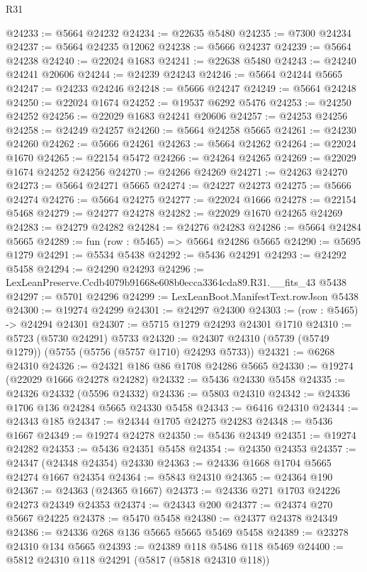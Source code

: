 \begin{lexlean}{R31}
\begin{coremodule}
@24233 := @5664 @24232
@24234 := @22635 @5480
@24235 := @7300 @24234
@24237 := @5664 @24235 @12062
@24238 := @5666 @24237
@24239 := @5664 @24238
@24240 := @22024 @1683
@24241 := @22638 @5480
@24243 := @24240 @24241 @20606
@24244 := @24239 @24243
@24246 := @5664 @24244 @5665
@24247 := @24233 @24246
@24248 := @5666 @24247
@24249 := @5664 @24248
@24250 := @22024 @1674
@24252 := @19537 @6292 @5476
@24253 := @24250 @24252
@24256 := @22029 @1683 @24241 @20606
@24257 := @24253 @24256
@24258 := @24249 @24257
@24260 := @5664 @24258 @5665
@24261 := @24230 @24260
@24262 := @5666 @24261
@24263 := @5664 @24262
@24264 := @22024 @1670
@24265 := @22154 @5472
@24266 := @24264 @24265
@24269 := @22029 @1674 @24252 @24256
@24270 := @24266 @24269
@24271 := @24263 @24270
@24273 := @5664 @24271 @5665
@24274 := @24227 @24273
@24275 := @5666 @24274
@24276 := @5664 @24275
@24277 := @22024 @1666
@24278 := @22154 @5468
@24279 := @24277 @24278
@24282 := @22029 @1670 @24265 @24269
@24283 := @24279 @24282
@24284 := @24276 @24283
@24286 := @5664 @24284 @5665
@24289 := fun (row : @5465) => @5664 @24286 @5665
@24290 := @5695 @1279
@24291 := @5534 @5438
@24292 := @5436 @24291
@24293 := @24292 @5458
@24294 := @24290 @24293
@24296 := LexLeanPreserve.Ccdb4079b91668e608b0ecca3364cda89.R31.__fits_43 @5438
@24297 := @5701 @24296
@24299 := LexLeanBoot.ManifestText.rowJson @5438
@24300 := @19274 @24299
@24301 := @24297 @24300
@24303 := (row : @5465) -> @24294 @24301
@24307 := @5715 @1279 @24293 @24301 @1710
@24310 := @5723 (@5730 @24291) @5733
@24320 := @24307 @24310 (@5739 (@5749 @1279)) (@5755 (@5756 (@5757 @1710) @24293 @5733))
@24321 := @6268 @24310
@24326 := @24321 @186 @86 @1708 @24286 @5665
@24330 := @19274 (@22029 @1666 @24278 @24282)
@24332 := @5436 @24330 @5458
@24335 := @24326 @24332 (@5596 @24332)
@24336 := @5803 @24310
@24342 := @24336 @1706 @136 @24284 @5665 @24330 @5458
@24343 := @6416 @24310
@24344 := @24343 @185
@24347 := @24344 @1705 @24275 @24283
@24348 := @5436 @1667
@24349 := @19274 @24278
@24350 := @5436 @24349
@24351 := @19274 @24282
@24353 := @5436 @24351 @5458
@24354 := @24350 @24353
@24357 := @24347 (@24348 @24354) @24330
@24363 := @24336 @1668 @1704 @5665 @24274 @1667 @24354
@24364 := @5843 @24310
@24365 := @24364 @190
@24367 := @24363 (@24365 @1667)
@24373 := @24336 @271 @1703 @24226 @24273 @24349 @24353
@24374 := @24343 @200
@24377 := @24374 @270 @5667 @24225
@24378 := @5470 @5458
@24380 := @24377 @24378 @24349
@24386 := @24336 @268 @136 @5665 @5665 @5469 @5458
@24389 := @23278 @24310 @134 @5665
@24393 := @24389 @118 @5486 @118 @5469
@24400 := @5812 @24310 @118 @24291 (@5817 (@5818 @24310 @118))

\end{coremodule}
\end{lexlean}
